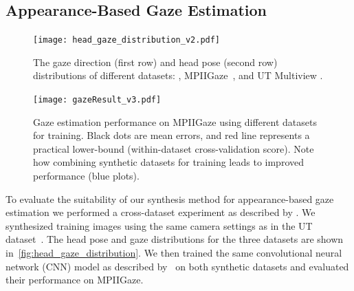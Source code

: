 

\subsection{Appearance-Based Gaze Estimation}




\begin{figure}
    \centering
    \texttt{[image: head\_gaze\_distribution\_v2.pdf]}
    \caption{The gaze direction (first row) and head pose (second row) distributions of different datasets: \dataset, MPIIGaze~\cite{zhang15_cvpr}, and UT Multiview \cite{sugano2014learning}.}
    \label{fig:head_gaze_distribution}
\end{figure}

\begin{figure}
    \centering
    \texttt{[image: gazeResult\_v3.pdf]}
    \caption{Gaze estimation performance on MPIIGaze using different datasets for training. Black dots are mean errors, and red line represents a practical lower-bound (within-dataset cross-validation score). Note how combining synthetic datasets for training leads to improved performance (blue plots).}
    \label{fig:gazeResult}
\end{figure}

To evaluate the suitability of our synthesis method for appearance-based gaze estimation we performed a cross-dataset experiment as described by \citet{zhang15_cvpr}.
We synthesized training images using the same camera settings as in the UT dataset~\cite{sugano2014learning}.
The head pose and gaze distributions for the three datasets are shown in~\autoref{fig:head_gaze_distribution}.
We then trained the same convolutional neural network (CNN) model as described by~\citet{zhang15_cvpr} on both synthetic datasets and evaluated their performance on MPIIGaze.

